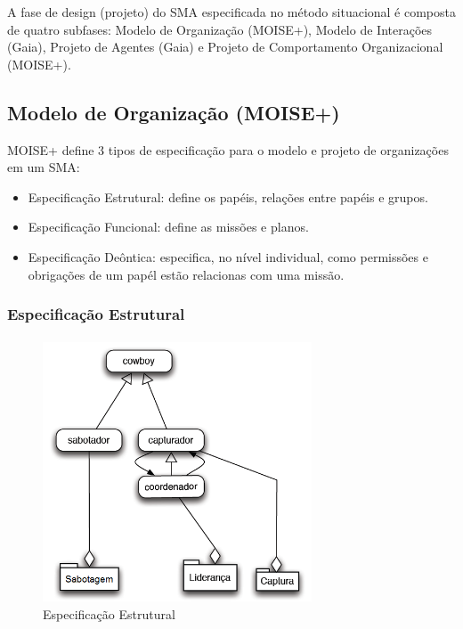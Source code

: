 \documentclass{llncs}
\begin{document}
A fase de design (projeto) do SMA especificada no método situacional é composta de quatro subfases: Modelo de Organização (MOISE+), Modelo de Interações (Gaia), Projeto de Agentes (Gaia) e Projeto de Comportamento Organizacional (MOISE+).


\subsection{Modelo de Organização (MOISE+)}

MOISE+ define 3 tipos de especificação para o modelo e projeto de organizações em um SMA: 

\begin{itemize}
\item Especificação Estrutural: define os papéis, relações entre papéis e grupos.
\item Especificação Funcional: define as missões e planos.
\item Especificação Deôntica: especifica, no nível individual, como permissões e obrigações de um papél estão relacionas com uma missão.
\end{itemize}


\newpage
\subsubsection{Especificação Estrutural}

\paragraph{ }

\begin{figure}[!ht]
\centering 
\includegraphics[width=8cm]{images/structuraspec.png}
\caption{Especificação Estrutural}
\end{figure}
\end{document}

